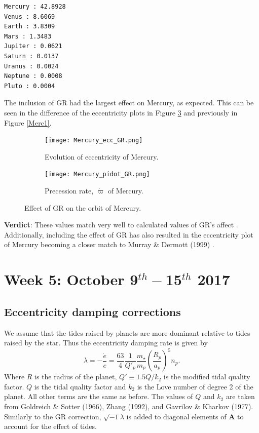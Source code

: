 \documentclass[11pt, oneside]{article}   	%
\begin{document}
\begin{verbatim}
Mercury : 42.8928
Venus : 8.6069 
Earth : 3.8309
Mars : 1.3483 
Jupiter : 0.0621 
Saturn : 0.0137 
Uranus : 0.0024 
Neptune : 0.0008 
Pluto : 0.0004 
\end{verbatim}

The inclusion of GR had the largest effect on Mercury, as expected. This can be seen in the difference of the eccentricity plots in Figure \ref{Merc2} and previously in Figure \ref{Merc1}.

\begin{figure}[!h]
    \centering
    \begin{subfigure}[t]{0.49\textwidth}
    \captionsetup{width=0.9\textwidth}
	\centering
       	 \texttt{[image: Mercury\_ecc\_GR.png]}
       	 \caption{Evolution of eccentricity of Mercury.}
        	\label{}
    \end{subfigure}
    \begin{subfigure}[t]{0.49\textwidth}
    \captionsetup{width=0.9\textwidth}
        	\centering
	\texttt{[image: Mercury\_pidot\_GR.png]}
        	\caption{Precession rate, $\dot{\varpi}$ of Mercury.}
        	\label{fig:pidot}
    \end{subfigure}
    \caption{Effect of GR on the orbit of Mercury.}
    \label{Merc2}
\end{figure}

\textbf{Verdict}: These values match very well to calculated values of GR's affect \cite{GRpidot}. Additionally, including the effect of GR has also resulted in the eccentricity plot of Mercury becoming a closer match to Murray \& Dermott (1999) \cite{ssd}.

\newpage

\section{Week 5: October 9$^{th} - $15$^{th}$ 2017}

\subsection{Eccentricity damping corrections}

We assume that the tides raised by planets are more dominant relative to tides raised by the star. Thus the eccentricity damping rate is given by \cite{ssd, Zhang2013}
\begin{equation}
\lambda = -\frac{\dot{e}}{e} = \frac{63}{4} \frac{1}{Q{}'_{p}}\frac{m_{\star}}{m_{p}} \left (\frac{R_{p}}{a_{p}} \right)^{5} n_{p}.
\end{equation}
Where $R$ is the radius of the planet, $Q{}' \equiv 1.5Q/k_{2}$ is the modified tidal quality factor. $Q$ is the tidal quality factor and $k_{2}$ is the Love number of degree 2 of the planet. All other terms are the same as before. The values of $Q$ and $k_{2}$ are taken from Goldreich \& Sotter (1966)\cite{Goldreich1966}, Zhang (1992)\cite{Zhang1992}, and Gavrilov \& Kharkov (1977)\cite{Gavrilov1977}. Similarly to the GR correction, $\sqrt{-1}\lambda$ is added to diagonal elements of $\mathbf{A}$ to account for the effect of tides.
\end{document}

